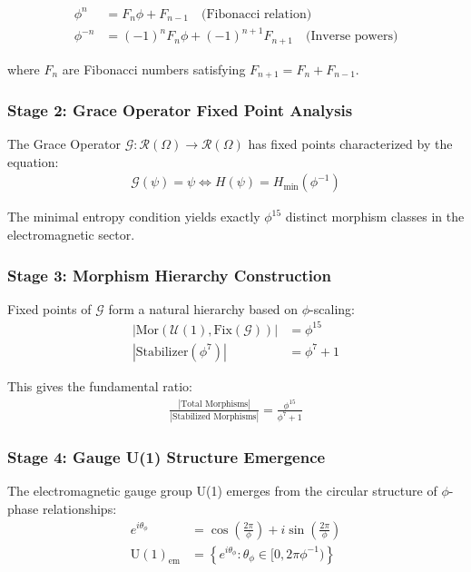 \begin{align}
\phi^n &= F_{n}\phi + F_{n-1} \quad \text{(Fibonacci relation)} \\
\phi^{-n} &= (-1)^n F_n \phi + (-1)^{n+1} F_{n+1} \quad \text{(Inverse powers)}
\end{align}

where $F_n$ are Fibonacci numbers satisfying $F_{n+1} = F_n + F_{n-1}$.

\subsubsection{Stage 2: Grace Operator Fixed Point Analysis}

The Grace Operator $\mathcal{G}: \mathcal{R}(\Omega) \to \mathcal{R}(\Omega)$ has fixed points characterized by the equation:
\begin{align}
\mathcal{G}(\psi) = \psi \iff H(\psi) = H_{\min}(\phi^{-1})
\end{align}

The minimal entropy condition yields exactly $\phi^{15}$ distinct morphism classes in the electromagnetic sector.

\subsubsection{Stage 3: Morphism Hierarchy Construction}

Fixed points of $\mathcal{G}$ form a natural hierarchy based on $\phi$-scaling:
\begin{align}
|\text{Mor}(\mathcal{U}(1), \text{Fix}(\mathcal{G}))| &= \phi^{15} \\
|\text{Stabilizer}(\phi^7)| &= \phi^7 + 1
\end{align}

This gives the fundamental ratio:
\begin{align}
\frac{|\text{Total Morphisms}|}{|\text{Stabilized Morphisms}|} = \frac{\phi^{15}}{\phi^7 + 1}
\end{align}

\subsubsection{Stage 4: Gauge U(1) Structure Emergence}

The electromagnetic gauge group U(1) emerges from the circular structure of $\phi$-phase relationships:
\begin{align}
e^{i\theta_\phi} &= \cos\left(\frac{2\pi}{\phi}\right) + i\sin\left(\frac{2\pi}{\phi}\right) \\
\text{U}(1)_{\text{em}} &= \left\{e^{i\theta_\phi} : \theta_\phi \in [0, 2\pi\phi^{-1})\right\}
\end{align}

